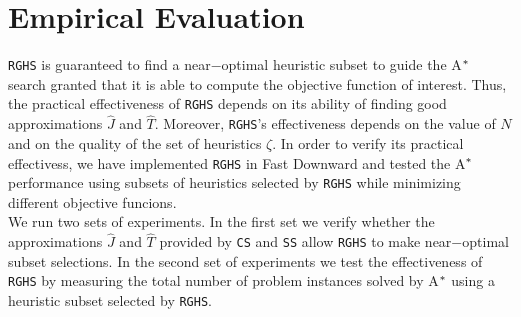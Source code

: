 



\chapter{Empirical Evaluation}\label{ch:empirical_evaluation}

\iffalse
\chapterprecis{The purpose of this section is to present how our meta-reasoning is applied when solving \texttt{IPC} domain problens.}\index{sinopse de capítulo}
\fi


\texttt{RGHS} is guaranteed to find a near$-$optimal heuristic subset to guide the A$\sp{*}$ search granted that it is able to compute the objective function of interest. Thus, the practical effectiveness of \texttt{RGHS} depends on its ability of finding good approximations $\hat{J}$ and $\hat{T}$. Moreover, \texttt{RGHS}'s effectiveness depends on the value of $N$ and on the quality of the set of heuristics $\zeta$. In order to verify its practical effectivess, we have implemented \texttt{RGHS} in Fast Downward \cite{helmert2006fast} and tested the A$\sp{*}$ performance using subsets of heuristics selected by \texttt{RGHS} while minimizing different objective funcions.\\

We run two sets of experiments. In the first set we verify whether the approximations $\hat{J}$ and $\hat{T}$ provided by \texttt{CS} and \texttt{SS} allow \texttt{RGHS} to make near$-$optimal subset selections. In the second set of experiments we test the effectiveness of \texttt{RGHS} by measuring the total number of problem instances solved by A$\sp{*}$ using a heuristic subset selected by \texttt{RGHS}.\\

